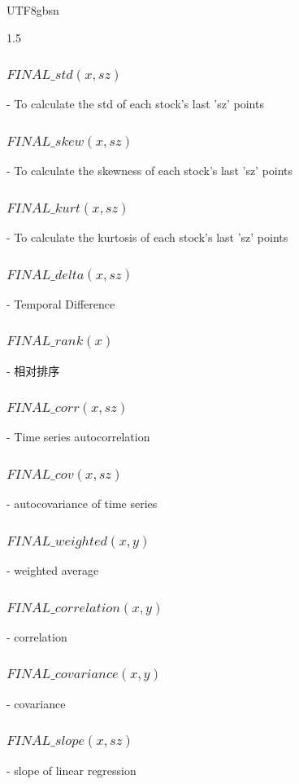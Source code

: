 \documentclass{article}
\begin{document}
\begin{CJK}{UTF8}{gbsn}
\begin{spacing}{1.5}
\subsubsection{$FINAL\_std(x, sz)$}                   
   - To calculate the std of each stock's last 'sz' points
\subsubsection{$FINAL\_skew(x, sz)$}                  
   - To calculate the skewness of each stock's last 'sz' points
\subsubsection{$FINAL\_kurt(x, sz)$}                  
   - To calculate the kurtosis of each stock's last 'sz' points
\subsubsection{$FINAL\_delta(x, sz)$}                 
   - Temporal Difference 
\subsubsection{$FINAL\_rank(x)$}                      
   - 相对排序          
\subsubsection{$FINAL\_corr(x, sz)$}                  
   - Time series autocorrelation
\subsubsection{$FINAL\_cov(x, sz)$}                   
   - autocovariance of time series
\subsubsection{$FINAL\_weighted(x, y)$}               
   - weighted average
\subsubsection{$FINAL\_correlation(x, y)$}            
   - correlation
\subsubsection{$FINAL\_covariance(x, y)$}             
   - covariance            
\subsubsection{$FINAL\_slope(x, sz)$}                 
   - slope of linear regression

\end{spacing}
\end{CJK}
\end{document}
